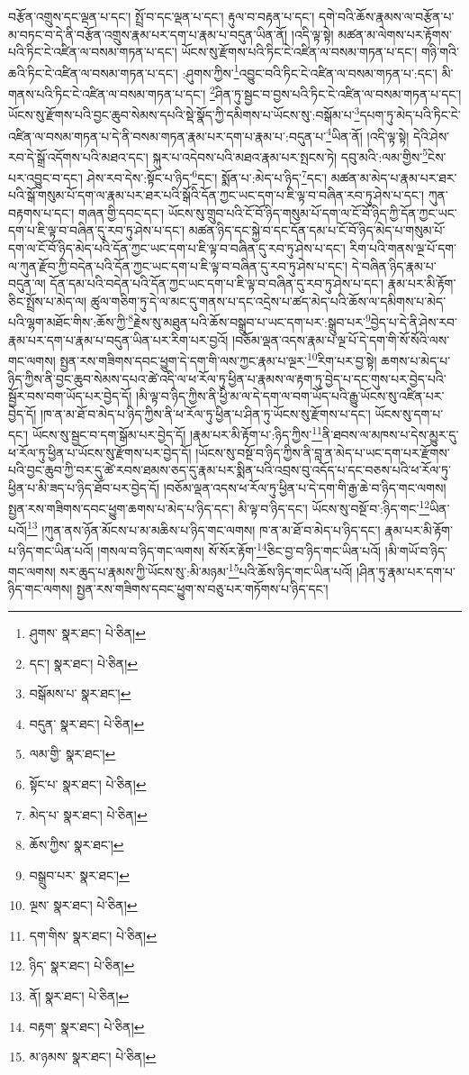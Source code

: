 བརྩོན་འགྲུས་དང་ལྡན་པ་དང་། སྤྲོ་བ་དང་ལྡན་པ་དང་། རྟུལ་བ་བརྟན་པ་དང་། དགེ་བའི་ཆོས་རྣམས་ལ་བརྩོན་པ་མ་བཏང་བ་དེ་ནི་བརྩོན་འགྲུས་རྣམ་པར་དག་པ་རྣམ་པ་བདུན་ཡིན་ནོ། །འདི་ལྟ་སྟེ། མཚན་མ་ལེགས་པར་རྟོགས་པའི་ཏིང་ངེ་འཛིན་ལ་བསམ་གཏན་པ་དང་། ཡོངས་སུ་རྫོགས་པའི་ཏིང་ངེ་འཛིན་ལ་བསམ་གཏན་པ་དང་། གཉི་གའི་ཆའི་ཏིང་ངེ་འཛིན་ལ་བསམ་གཏན་པ་དང་། :ཤུགས་ཀྱིས་\footnote{ཤུགས་  སྣར་ཐང་།  པེ་ཅིན། }འབྱུང་བའི་ཏིང་ངེ་འཛིན་ལ་བསམ་གཏན་པ་:དང་། མི་གནས་པའི་ཏིང་ངེ་འཛིན་ལ་བསམ་གཏན་པ་དང་། \footnote{དང་།    སྣར་ཐང་།  པེ་ཅིན། }ཤིན་ཏུ་སྦྱང་བ་བྱས་པའི་ཏིང་ངེ་འཛིན་ལ་བསམ་གཏན་པ་དང་། ཡོངས་སུ་རྫོགས་པའི་བྱང་ཆུབ་སེམས་དཔའི་སྡེ་སྣོད་ཀྱི་དམིགས་པ་ཡོངས་སུ་:བསྒོམ་པ་\footnote{བསྒོམས་པ་  སྣར་ཐང་། }དཔག་ཏུ་མེད་པའི་ཏིང་ངེ་འཛིན་ལ་བསམ་གཏན་པ་དེ་ནི་བསམ་གཏན་རྣམ་པར་དག་པ་རྣམ་པ་:བདུན་པ་\footnote{བདུན་  སྣར་ཐང་།  པེ་ཅིན། }ཡིན་ནོ། །འདི་ལྟ་སྟེ། དེའི་ཤེས་རབ་དེ་སྒྲོ་འདོགས་པའི་མཐའ་དང་། སྐུར་པ་འདེབས་པའི་མཐའ་རྣམ་པར་སྤངས་ཏེ། དབུ་མའི་:ལམ་གྱིས་\footnote{ལམ་གྱི་  སྣར་ཐང་། }ངེས་པར་འབྱུང་བ་དང་། ཤེས་རབ་དེས་:སྟོང་པ་ཉིད་\footnote{སྟོང་པ་  སྣར་ཐང་།  པེ་ཅིན། }དང་། སྨོན་པ་:མེད་པ་ཉིད་\footnote{མེད་པ་  སྣར་ཐང་།  པེ་ཅིན། }དང་། མཚན་མ་མེད་པ་རྣམ་པར་ཐར་པའི་སྒོ་གསུམ་པོ་དག་ལ་རྣམ་པར་ཐར་པའི་སྒོའི་དོན་ཀྱང་ཡང་དག་པ་ཇི་ལྟ་བ་བཞིན་རབ་ཏུ་ཤེས་པ་དང་། ཀུན་བརྟགས་པ་དང་། གཞན་གྱི་དབང་དང་། ཡོངས་སུ་གྲུབ་པའི་ངོ་བོ་ཉིད་གསུམ་པོ་དག་ལ་ངོ་བོ་ཉིད་ཀྱི་དོན་ཀྱང་ཡང་དག་པ་ཇི་ལྟ་བ་བཞིན་དུ་རབ་ཏུ་ཤེས་པ་དང་། མཚན་ཉིད་དང་སྐྱེ་བ་དང་དོན་དམ་པ་ངོ་བོ་ཉིད་མེད་པ་གསུམ་པོ་དག་ལ་ངོ་བོ་ཉིད་མེད་པའི་དོན་ཀྱང་ཡང་དག་པ་ཇི་ལྟ་བ་བཞིན་དུ་རབ་ཏུ་ཤེས་པ་དང་། རིག་པའི་གནས་ལྔ་པོ་དག་ལ་ཀུན་རྫོབ་ཀྱི་བདེན་པའི་དོན་ཀྱང་ཡང་དག་པ་ཇི་ལྟ་བ་བཞིན་དུ་རབ་ཏུ་ཤེས་པ་དང་། དེ་བཞིན་ཉིད་རྣམ་པ་བདུན་ལ། དོན་དམ་པའི་བདེན་པའི་དོན་ཀྱང་ཡང་དག་པ་ཇི་ལྟ་བ་བཞིན་དུ་རབ་ཏུ་ཤེས་པ་དང་། རྣམ་པར་མི་རྟོག་ཅིང་སྤྲོས་པ་མེད་ལ། ཚུལ་གཅིག་ཏུ་དེ་ལ་མང་དུ་གནས་པ་དང་འདྲེས་པ་ཚད་མེད་པའི་ཆོས་ལ་དམིགས་པ་མེད་པའི་ལྷག་མཐོང་གིས་:ཆོས་ཀྱི་\footnote{ཆོས་ཀྱིས་  སྣར་ཐང་། }རྗེས་སུ་མཐུན་པའི་ཆོས་བསྒྲུབ་པ་ཡང་དག་པར་:སྒྲུབ་པར་\footnote{བསྒྲུབ་པར་  སྣར་ཐང་། }བྱེད་པ་དེ་ནི་ཤེས་རབ་རྣམ་པར་དག་པ་རྣམ་པ་བདུན་ཡིན་པར་རིག་པར་བྱའོ། །བཅོམ་ལྡན་འདས་རྣམ་པ་ལྔ་པོ་དེ་དག་གི་སོ་སོའི་ལས་གང་ལགས། སྤྱན་རས་གཟིགས་དབང་ཕྱུག་དེ་དག་གི་ལས་ཀྱང་རྣམ་པ་ལྔར་\footnote{ལྔས་  སྣར་ཐང་།  པེ་ཅིན། }རིག་པར་བྱ་སྟེ། ཆགས་པ་མེད་པ་ཉིད་ཀྱིས་ནི་བྱང་ཆུབ་སེམས་དཔའ་ཚེ་འདི་ལ་ཕ་རོལ་ཏུ་ཕྱིན་པ་རྣམས་ལ་རྟག་ཏུ་བྱེད་པ་དང་གུས་པར་བྱེད་པའི་སྦྱོར་བས་བག་ཡོད་པར་བྱེད་དོ། །མི་ལྟ་བ་ཉིད་ཀྱིས་ནི་ཕྱི་མ་ལ་དེ་དག་ལ་བག་ཡོད་པའི་རྒྱུ་ཡོངས་སུ་འཛིན་པར་བྱེད་དོ། །ཁ་ན་མ་ཐོ་བ་མེད་པ་ཉིད་ཀྱིས་ནི་ཕ་རོལ་ཏུ་ཕྱིན་པ་ཤིན་ཏུ་ཡོངས་སུ་རྫོགས་པ་དང་། ཡོངས་སུ་དག་པ་དང་། ཡོངས་སུ་སྦྱང་བ་དག་སྒོམ་པར་བྱེད་དོ། །རྣམ་པར་མི་རྟོག་པ་:ཉིད་ཀྱིས་\footnote{དག་གིས་  སྣར་ཐང་།  པེ་ཅིན། }ནི་ཐབས་ལ་མཁས་པ་དེས་མྱུར་དུ་ཕ་རོལ་ཏུ་ཕྱིན་པ་ཡོངས་སུ་རྫོགས་པར་བྱེད་དོ། །ཡོངས་སུ་བསྔོ་བ་ཉིད་ཀྱིས་ནི་བླ་ན་མེད་པ་ཡང་དག་པར་རྫོགས་པའི་བྱང་ཆུབ་ཀྱི་བར་དུ་ཚེ་རབས་ཐམས་ཅད་དུ་རྣམ་པར་སྨིན་པའི་འབྲས་བུ་འདོད་པ་དང་བཅས་པའི་ཕ་རོལ་ཏུ་ཕྱིན་པ་མི་ཟད་པ་ཉིད་ཐོབ་པར་བྱེད་དོ། །བཅོམ་ལྡན་འདས་ཕ་རོལ་ཏུ་ཕྱིན་པ་དེ་དག་གི་རྒྱ་ཆེ་བ་ཉིད་གང་ལགས། སྤྱན་རས་གཟིགས་དབང་ཕྱུག་ཆགས་པ་མེད་པ་ཉིད་དང་། མི་ལྟ་བ་ཉིད་དང་། ཡོངས་སུ་བསྔོ་བ་:ཉིད་གང་\footnote{ཉིད་  སྣར་ཐང་།  པེ་ཅིན། }ཡིན་པའོ།\footnote{ནོ།  སྣར་ཐང་།  པེ་ཅིན། } །ཀུན་ནས་ཉོན་མོངས་པ་མ་མཆིས་པ་ཉིད་གང་ལགས། ཁ་ན་མ་ཐོ་བ་མེད་པ་ཉིད་དང་། རྣམ་པར་མི་རྟོག་པ་ཉིད་གང་ཡིན་པའོ། །གསལ་བ་ཉིད་གང་ལགས། སོ་སོར་རྟོག་\footnote{བརྟག་  སྣར་ཐང་།  པེ་ཅིན། }ཅིང་བྱ་བ་ཉིད་གང་ཡིན་པའོ། །མི་གཡོ་བ་ཉིད་གང་ལགས། སར་ཆུད་པ་རྣམས་ཀྱི་ཡོངས་སུ་:མི་མཉམ་\footnote{མ་ཉམས་  སྣར་ཐང་།  པེ་ཅིན། }པའི་ཆོས་ཉིད་གང་ཡིན་པའོ། །ཤིན་ཏུ་རྣམ་པར་དག་པ་ཉིད་གང་ལགས། སྤྱན་རས་གཟིགས་དབང་ཕྱུག་ས་བཅུ་པར་གཏོགས་པ་ཉིད་དང་། 